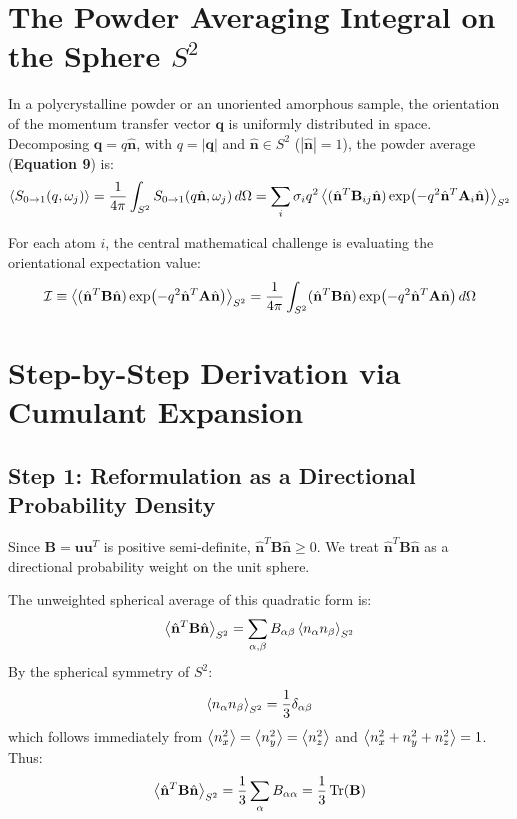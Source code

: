 \documentclass[11pt,a4paper]{article}
\begin{document}
\section{The Powder Averaging Integral on the Sphere $S^2$}

In a polycrystalline powder or an unoriented amorphous sample, the orientation of the momentum transfer vector $\mathbf{q}$ is uniformly distributed in space. Decomposing $\mathbf{q} = q \hat{\mathbf{n}}$, with $q = |\mathbf{q}|$ and $\hat{\mathbf{n}} \in S^2$ ($|\hat{\mathbf{n}}| = 1$), the powder average (\textbf{Equation 9}) is:
\begin{equation}
\ev{S_{0 \to 1}(q, \omega_j)} = \frac{1}{4\pi} \int_{S^2} S_{0 \to 1}(q \hat{\mathbf{n}}, \omega_j) \, d\Omega = \sum_i \sigma_i q^2 \ev{(\hat{\mathbf{n}}^T \mathbf{B}_{ij} \hat{\mathbf{n}}) \exp(-q^2 \hat{\mathbf{n}}^T \mathbf{A}_i \hat{\mathbf{n}})}_{S^2}
\end{equation}

For each atom $i$, the central mathematical challenge is evaluating the orientational expectation value:
\begin{equation}
\mathcal{I} \equiv \ev{(\hat{\mathbf{n}}^T \mathbf{B} \hat{\mathbf{n}}) \exp(-q^2 \hat{\mathbf{n}}^T \mathbf{A} \hat{\mathbf{n}})}_{S^2} = \frac{1}{4\pi} \int_{S^2} (\hat{\mathbf{n}}^T \mathbf{B} \hat{\mathbf{n}}) \exp(-q^2 \hat{\mathbf{n}}^T \mathbf{A} \hat{\mathbf{n}}) \, d\Omega
\end{equation}

\section{Step-by-Step Derivation via Cumulant Expansion}

\subsection{Step 1: Reformulation as a Directional Probability Density}
Since $\mathbf{B} = \mathbf{u} \mathbf{u}^T$ is positive semi-definite, $\hat{\mathbf{n}}^T \mathbf{B} \hat{\mathbf{n}} \ge 0$. We treat $\hat{\mathbf{n}}^T \mathbf{B} \hat{\mathbf{n}}$ as a directional probability weight on the unit sphere.

The unweighted spherical average of this quadratic form is:
\begin{equation}
\ev{\hat{\mathbf{n}}^T \mathbf{B} \hat{\mathbf{n}}}_{S^2} = \sum_{\alpha, \beta} B_{\alpha\beta} \ev{n_\alpha n_\beta}_{S^2}
\end{equation}
By the spherical symmetry of $S^2$:
\begin{equation}
\ev{n_\alpha n_\beta}_{S^2} = \frac{1}{3} \delta_{\alpha\beta}
\end{equation}
which follows immediately from $\ev{n_x^2} = \ev{n_y^2} = \ev{n_z^2}$ and $\ev{n_x^2 + n_y^2 + n_z^2} = 1$. Thus:
\begin{equation}
\ev{\hat{\mathbf{n}}^T \mathbf{B} \hat{\mathbf{n}}}_{S^2} = \frac{1}{3} \sum_\alpha B_{\alpha\alpha} = \frac{1}{3} \Tr(\mathbf{B})
\end{equation}
\end{document}
